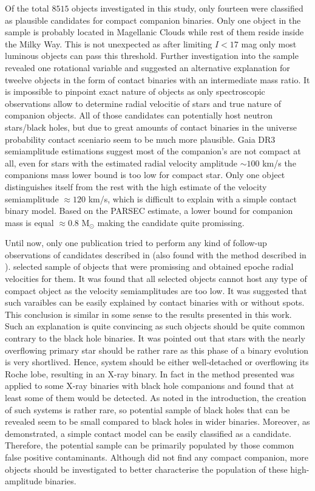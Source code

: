 \documentclass{pracalicmgr}
\begin{document}
Of the total $8515$ objects investigated in this study, only fourteen were classified as plausible candidates for compact companion binaries.
Only one object in the sample is probably located in Magellanic Clouds while rest of them reside inside the Milky Way. 
This is not unexpected as after limiting $I<17$ mag only most luminous objects can pass this threshold.
Further investigation into the sample revealed one rotational variable and suggested an alternative explanation for tweelve objects in the form of
contact binaries with an intermediate mass ratio. It is impossible to pinpoint exact nature of objects as only spectroscopic observations allow to determine 
radial velocitie of stars and true nature of companion objects. All of those candidates can potentially host neutron stars/black holes, but
due to great amounts of contact binaries in the universe probability contact sceniario seem to be much more plausible.
Gaia DR3 semiamplitude estimations suggest most of the companion's are not compact at all, even for stars with the estimated radial velocity amplitude $\sim100$ km/s
the companions mass lower bound is too low for compact star.
Only one object distinguishes itself from the rest with the high estimate of the velocity semiamplitude $\approx120$ km/s, which is difficult to explain with a simple contact binary model. 
Based on the PARSEC estimate, a lower bound for companion mass is equal $\approx0.8$ M$_{\odot}$ making the candidate quite promissing. 

Until now, only one publication tried to perform any kind of follow-up observations of candidates described in \citet{gomel_gaia_2022} (also 
found with the method described in \citet{gomel_search_2021-2}). \citet{nagarajan_spectroscopic_2023} selected sample of objects that were promissing
and obtained epoche radial velocities for them. It was found that all selected objects cannot host any type of compact object as the velocity semiamplitudes are too low.
It was suggested that such varaibles can be easily explained by contact binaries with or without spots. This conclusion is similar in some sense to the results presented in this work.
Such an explanation is quite convincing as such objects should be quite common contrary to the black hole binaries. It was pointed out that stars with the nearly overflowing
primary star should be rather rare as this phase of a binary evolution is very shortlived. Hence, system should be either well-detached or overflowing its Roche lobe,
resulting in an X-ray binary.  In fact in \citet{gomel_search_2021-2} the method presented was applied to some X-ray binaries with black hole companions and
found that at least some of them would be detected.
As noted in the introduction, the creation of such systems is rather rare, so potential sample of black holes that can be revealed seem
to be small compared to black holes in wider binaries.
Moreover, as demonstrated, a simple contact model can be easily classified as a candidate. 
Therefore, the potential sample can be primarily populated by those common false positive contaminants.
Although \citet{nagarajan_spectroscopic_2023} did not find any compact companion,
more objects should be investigated to better characterise the population of these high-amplitude binaries.
\end{document}
